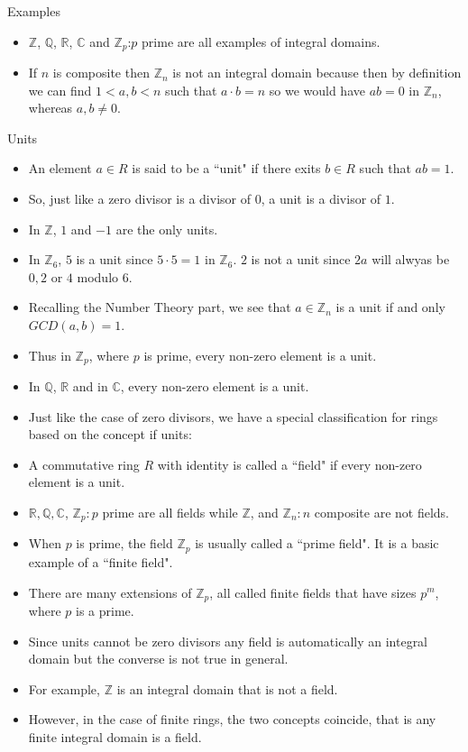 \documentclass[ %
 10pt, xcolor={dvipsnames,svgnames,x11names,hyperref},
   hyperref={colorlinks=true,citecolor=green,linkcolor=DarkRed,urlcolor=ProcessBlue,anchorcolor=blue}
  ]{beamer}
\newenvironment{stepitemize}{\begin{itemize}[<+->]}{\end{itemize} }
\newcommand{\Z}{\mathbb{Z}}
\newcommand{\Q}{\mathbb{Q}}
\newcommand{\R}{\mathbb{R}}
\newcommand{\C}{\mathbb{C}}
\begin{document}
\begin{frame}{Examples}
\begin{stepitemize}
\item $\Z$, $\Q$, $\R$, $\C$ and $\Z_p$:$p$ prime
 are all examples of integral domains. 
 \item If $n$ is composite then $\Z_n$ is not an integral domain because then by definition we can find $1<a,b<n$ such that $a\cdot b=n$ so we would have $ab=0$ in $\Z_n$, whereas $a, b\neq 0$.     
\end{stepitemize}
    
\end{frame}
\begin{frame}{Units}
\begin{stepitemize}
\item An element $a\in R$ is said to be a ``unit" if there exits $b\in R$ such that $ab=1$.
\item So,  just like a zero divisor is a divisor of $0$, a unit is a divisor of $1$.
\item In $\Z$, $1$ and $-1$ are the only units.
    \item In $\Z_6$, $5$ is a unit since $5\cdot 5 =1$ in $\Z_6$. $2$ is not a unit since $2a$ will alwyas be $0,2$ or $4$ modulo $6$.
    \item Recalling the Number Theory part, we see that $a\in \Z_n$ is a unit if and only $GCD(a,b)=1$.
    \item Thus in $\Z_p$, where $p$ is prime, every non-zero element is a unit. 
    \item In $\Q$, $\R$ and in $\C$, every non-zero element is a unit. 
\end{stepitemize}
    \end{frame}
\begin{frame}{}
    \begin{stepitemize}
    \item Just like the case of zero divisors, we have a special classification for rings based on the concept if units:
\item A commutative ring $R$ with identity is called a ``field" if every non-zero element is a unit.
\item 
$\R, \Q, \C$, $\Z_p:p$ prime are all fields while $\Z$, and $\Z_n:n$ composite are not fields. 
\item When $p$ is prime, the field $\Z_p$ is usually called a ``prime field". It is a basic example of a ``finite field". \item There are many extensions of $\Z_p$, all called finite fields that have sizes $p^m$, where $p$ is a prime. 

\item Since units cannot be zero divisors any field is automatically an integral domain but the converse is not true in general. 
\item For example, $\Z$ is an integral domain that is not a field. 
\item However, in the case of finite rings, the two concepts coincide, that is any finite integral domain is a field.
    \end{stepitemize}
\end{frame}
\end{document}
